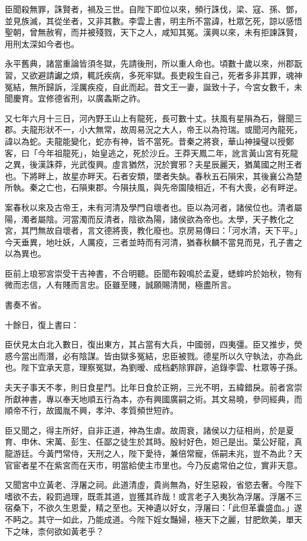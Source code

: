 \begin{pinyinscope}
臣聞殺無罪，誅賢者，禍及三世。自陛下即位以來，頻行誅伐，梁、寇、孫、鄧，並見族滅，其從坐者，又非其數。李雲上書，明主所不當諱，杜眾乞死，諒以感悟聖朝，曾無赦宥，而并被殘戮，天下之人，咸知其冤。漢興以來，未有拒諫誅賢，用刑太深如今者也。

永平舊典，諸當重論皆須冬獄，先請後刑，所以重人命也。頃數十歲以來，州郡翫習，又欲避請讞之煩，輒託疾病，多死牢獄。長吏殺生自己，死者多非其罪，魂神冤結，無所歸訴，淫厲疾疫，自此而起。昔文王一妻，誕致十子，今宮女數千，未聞慶育。宜修德省刑，以廣螽斯之祚。

又七年六月十三日，河內野王山上有龍死，長可數十丈。扶風有星隕為石，聲聞三郡。夫龍形狀不一，小大無常，故周易況之大人，帝王以為符瑞。或聞河內龍死，諱以為蛇。夫龍能變化，蛇亦有神，皆不當死。昔秦之將衰，華山神操璧以授鄭客，曰「今年祖龍死」，始皇逃之，死於沙丘。王莽天鳳二年，訛言黃山宮有死龍之異，後漢誅莽，光武復興。虛言猶然，況於實邪？夫星辰麗天，猶萬國之附王者也。下將畔上，故星亦畔天。石者安類，墜者失埶。春秋五石隕宋，其後襄公為楚所執。秦之亡也，石隕東郡。今隕扶風，與先帝園陵相近，不有大喪，必有畔逆。

案春秋以來及古帝王，未有河清及學門自壞者也。臣以為河者，諸侯位也。清者屬陽，濁者屬陰。河當濁而反清者，陰欲為陽，諸侯欲為帝也。太學，天子教化之宮，其門無故自壞者，言文德將喪，教化廢也。京房易傳曰：「河水清，天下平。」今天垂異，地吐妖，人厲疫，三者並時而有河清，猶春秋麟不當見而見，孔子書之以為異也。

臣前上琅邪宮崇受干吉神書，不合明聽。臣聞布穀鳴於孟夏，蟋蟀吟於始秋，物有微而志信，人有賤而言忠。臣雖至賤，誠願賜清閒，極盡所言。

書奏不省。

十餘日，復上書曰：

臣伏見太白北入數日，復出東方，其占當有大兵，中國弱，四夷彊。臣又推步，熒惑今當出而潛，必有陰謀。皆由獄多冤結，忠臣被戮。德星所以久守執法，亦為此也。陛下宜承天意，理察冤獄，為劉暧、成档虧除罪辟，追錄李雲、杜眾等子孫。

夫天子事天不孝，則日食星鬥。比年日食於正朔，三光不明，五緯錯戾。前者宮崇所獻神書，專以奉天地順五行為本，亦有興國廣嗣之術。其文易曉，參同經典，而順帝不行，故國胤不興，孝沖、孝質頻世短祚。

臣又聞之，得主所好，自非正道，神為生虐。故周衰，諸侯以力征相尚，於是夏育、申休、宋萬、彭生、任鄙之徒生於其時。殷紂好色，妲己是出。葉公好龍，真龍游廷。今黃門常侍，天刑之人，陛下愛待，兼倍常寵，係嗣未兆，豈不為此？天官宦者星不在紫宮而在天市，明當給使主市里也。今乃反處常伯之位，實非天意。

又聞宮中立黃老、浮屠之祠。此道清虛，貴尚無為，好生惡殺，省慾去奢。今陛下嗜欲不去，殺罰過理，既乖其道，豈獲其祚哉！或言老子入夷狄為浮屠。浮屠不三宿桑下，不欲久生恩愛，精之至也。天神遺以好女，浮屠曰：「此但革囊盛血。」遂不眄之。其守一如此，乃能成道。今陛下婬女豔婦，極天下之麗，甘肥飲美，單天下之味，柰何欲如黃老乎？


\end{pinyinscope}
